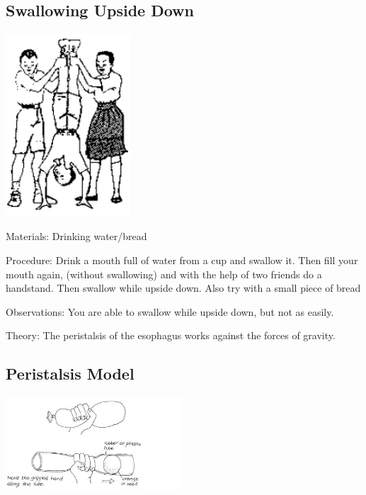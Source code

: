 \begin{multicols}{2}
\subsection{Swallowing Upside Down} %

\begin{center}
\includegraphics[width=0.35\textwidth]{./img/source/peristalsis.png}
\end{center}

\begin{description*}
\item[Materials:]{Drinking water/bread}
\item[Procedure:]{Drink a mouth full of water from a cup and swallow it. Then fill your mouth again, (without
swallowing) and with the help of two friends do a handstand. Then swallow while upside down. Also try with a small piece of bread}
\item[Observations:]{You are able to swallow while upside down, but not as easily.}
\item[Theory:]{The peristalsis of the
esophagus works against the forces of gravity.}
\end{description*}

\subsection{Peristalsis Model} %

\begin{center}
\includegraphics[width=0.49\textwidth]{./img/vso/peristalsis-model.jpg}
\end{center}


\end{multicols}
